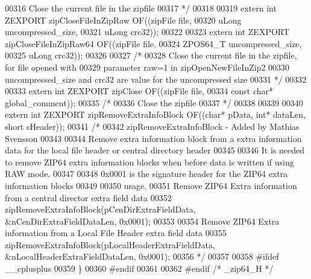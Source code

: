 \begin{DoxyCode}
00316 \textcolor{comment}{  Close the current file in the zipfile}
00317 \textcolor{comment}{*/}
00318 
00319 \textcolor{keyword}{extern} \textcolor{keywordtype}{int} ZEXPORT zipCloseFileInZipRaw OF((zipFile file,
00320                                             uLong uncompressed\_size,
00321                                             uLong crc32));
00322 
00323 \textcolor{keyword}{extern} \textcolor{keywordtype}{int} ZEXPORT zipCloseFileInZipRaw64 OF((zipFile file,
00324                                             ZPOS64\_T uncompressed\_size,
00325                                             uLong crc32));
00326 
00327 \textcolor{comment}{/*}
00328 \textcolor{comment}{  Close the current file in the zipfile, for file opened with}
00329 \textcolor{comment}{    parameter raw=1 in zipOpenNewFileInZip2}
00330 \textcolor{comment}{  uncompressed\_size and crc32 are value for the uncompressed size}
00331 \textcolor{comment}{*/}
00332 
00333 \textcolor{keyword}{extern} \textcolor{keywordtype}{int} ZEXPORT zipClose OF((zipFile file,
00334                 \textcolor{keyword}{const} \textcolor{keywordtype}{char}* global\_comment));
00335 \textcolor{comment}{/*}
00336 \textcolor{comment}{  Close the zipfile}
00337 \textcolor{comment}{*/}
00338 
00339 
00340 \textcolor{keyword}{extern} \textcolor{keywordtype}{int} ZEXPORT zipRemoveExtraInfoBlock OF((\textcolor{keywordtype}{char}* pData, \textcolor{keywordtype}{int}* dataLen, \textcolor{keywordtype}{short} sHeader));
00341 \textcolor{comment}{/*}
00342 \textcolor{comment}{  zipRemoveExtraInfoBlock -  Added by Mathias Svensson}
00343 \textcolor{comment}{}
00344 \textcolor{comment}{  Remove extra information block from a extra information data for the local file header or central
       directory header}
00345 \textcolor{comment}{}
00346 \textcolor{comment}{  It is needed to remove ZIP64 extra information blocks when before data is written if using RAW mode.}
00347 \textcolor{comment}{}
00348 \textcolor{comment}{  0x0001 is the signature header for the ZIP64 extra information blocks}
00349 \textcolor{comment}{}
00350 \textcolor{comment}{  usage.}
00351 \textcolor{comment}{                        Remove ZIP64 Extra information from a central director extra field data}
00352 \textcolor{comment}{              zipRemoveExtraInfoBlock(pCenDirExtraFieldData, &nCenDirExtraFieldDataLen, 0x0001);}
00353 \textcolor{comment}{}
00354 \textcolor{comment}{                        Remove ZIP64 Extra information from a Local File Header extra field data}
00355 \textcolor{comment}{        zipRemoveExtraInfoBlock(pLocalHeaderExtraFieldData, &nLocalHeaderExtraFieldDataLen, 0x0001);}
00356 \textcolor{comment}{*/}
00357 
00358 \textcolor{preprocessor}{#ifdef \_\_cplusplus}
00359 \}
00360 \textcolor{preprocessor}{#endif}
00361 
00362 \textcolor{preprocessor}{#endif }\textcolor{comment}{/* \_zip64\_H */}\textcolor{preprocessor}{}
\end{DoxyCode}
